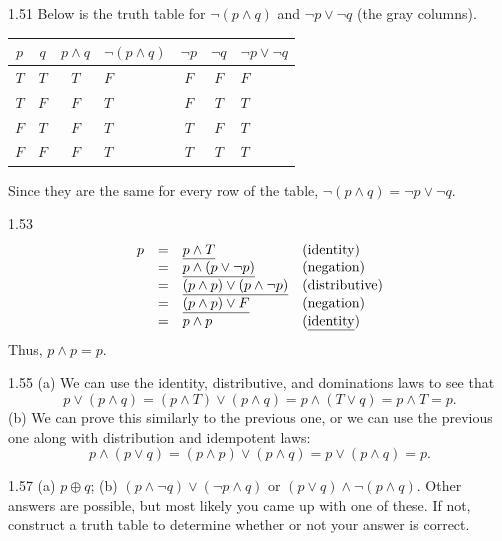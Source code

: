 \begin{Answer}{1.51}
Below is the truth table for $\neg (p\wedge q)$ and  $\neg p \vee \neg q$ (the gray columns).

\centering
\begin{tabular}{|cc||c|g|c|c|g|}
\hline
$p$ & $q$ & $p\wedge q$ & $\neg (p\wedge q)$ & $\neg p$ & $\neg q$ & $\neg p \vee \neg q$ \\
\hline
$T$ & $T$ & $T$ & $F $ & $F $ & $F $ & $F$ \\
$T$ & $F$ & $F$ & $T $ & $F $ & $T $ & $T$ \\
$F$ & $T$ & $F$ & $T $ & $T $ & $F $ & $T$ \\
$F$ & $F$ & $F$ & $T $ & $T $ & $T $ & $T$ \\
\hline
\end{tabular}

Since they are the same for every row of the table,  $\neg (p\wedge q) = \neg p \vee \neg q$.
\end{Answer}
\begin{Answer}{1.53}
$$
\begin{array}{llll}
p &=&\underline{p \wedge T} &\mbox{(identity)}\\
&=&\underline{ p \wedge (p\vee \neg p)} &\mbox{(negation)}\\
&=&\underline{(p \wedge p)\vee(p \wedge\neg p)} &\mbox{(distributive)}\\
&=&\underline{(p\wedge p)\vee F}&\mbox{(negation)}\\
&=& p\wedge p &\mbox{(\underline{identity})}\\
\end{array} $$
Thus, \underline{$p\wedge p  = p$}.
\end{Answer}
\begin{Answer}{1.55}
(a) We can use the identity, distributive, and dominations laws to see that
$$p\vee(p\wedge q) = (p\wedge T)\vee (p\wedge q)=p\wedge(T\vee q) = p\wedge T = p.$$
(b) We can prove this similarly to the previous one, or we can use the previous one
along with distribution and idempotent laws:
$$p\wedge(p\vee q) = (p\wedge p)\vee(p\wedge q) = p\vee(p\wedge q)=p.$$
\end{Answer}
\begin{Answer}{1.57}
(a) $p\oplus q$;
(b) $(p\wedge \neg q)\vee(\neg p\wedge q)$ or $(p\vee q)\wedge \neg(p\wedge q)$.
Other answers are possible, but most likely you came up with one of these.
If not, construct a truth table to determine whether or not your answer is correct.
\end{Answer}
